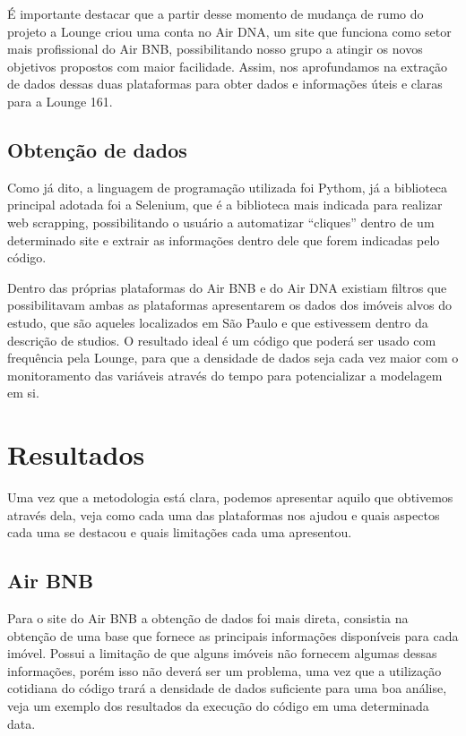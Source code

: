 É importante destacar que a partir desse momento de mudança de 
rumo do projeto a Lounge criou uma conta no Air DNA, um site que funciona 
como setor mais profissional do Air BNB, possibilitando nosso grupo a atingir 
os novos objetivos propostos com maior facilidade. Assim, nos aprofundamos 
na extração de dados dessas duas plataformas para obter dados e 
informações úteis e claras para a Lounge 161.

\subsection*{Obtenção de dados}
Como já dito, a linguagem de programação utilizada foi Pythom, já a
biblioteca principal adotada foi a Selenium, que é a
biblioteca mais indicada para realizar web scrapping, 
possibilitando o usuário a automatizar “cliques” dentro 
de um determinado site e extrair as informações dentro dele que forem 
indicadas pelo código.

Dentro das próprias plataformas do Air BNB e do Air DNA existiam 
filtros que possibilitavam ambas as plataformas apresentarem os dados dos 
imóveis alvos do estudo, que são aqueles localizados em São Paulo e que 
estivessem dentro da descrição de studios. O resultado ideal é um código que 
poderá ser usado com frequência pela Lounge, para que a densidade de 
dados seja cada vez maior com o monitoramento das variáveis através do 
tempo para potencializar a modelagem em si.

\section*{Resultados}

Uma vez que a metodologia está clara, podemos apresentar aquilo que 
obtivemos através dela, veja como cada uma das plataformas nos ajudou e quais 
aspectos cada uma se destacou e quais limitações cada uma apresentou.

\subsection*{Air BNB}

Para o site do Air BNB a obtenção de dados foi mais direta, consistia 
na obtenção de uma base que fornece as principais informações disponíveis 
para cada imóvel. Possui a limitação de que alguns imóveis não fornecem
algumas dessas informações, porém isso não deverá ser um problema, uma 
vez que a utilização cotidiana do código trará a densidade de dados suficiente 
para uma boa análise, veja um exemplo dos resultados da execução do código 
em uma determinada data.

